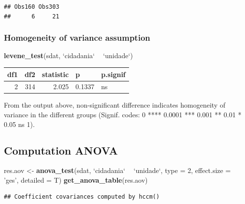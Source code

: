 \documentclass[]{article}
\newenvironment{Shaded}{\begin{snugshade}}{\end{snugshade}}
\newcommand{\DataTypeTok}[1]{\textcolor[rgb]{0.13,0.29,0.53}{#1}}
\newcommand{\DecValTok}[1]{\textcolor[rgb]{0.00,0.00,0.81}{#1}}
\newcommand{\KeywordTok}[1]{\textcolor[rgb]{0.13,0.29,0.53}{\textbf{#1}}}
\newcommand{\NormalTok}[1]{#1}
\newcommand{\OperatorTok}[1]{\textcolor[rgb]{0.81,0.36,0.00}{\textbf{#1}}}
\newcommand{\StringTok}[1]{\textcolor[rgb]{0.31,0.60,0.02}{#1}}
\begin{document}
\begin{verbatim}
## Obs160 Obs303 
##      6     21
\end{verbatim}

\hypertarget{homogeneity-of-variance-assumption}{%
\subsubsection{Homogeneity of variance
assumption}\label{homogeneity-of-variance-assumption}}

\begin{Shaded}
\begin{Highlighting}[]
\KeywordTok{levene_test}\NormalTok{(sdat, }\StringTok{`}\DataTypeTok{cidadania}\StringTok{`} \OperatorTok{~}\StringTok{ `}\DataTypeTok{unidade}\StringTok{`}\NormalTok{)}
\end{Highlighting}
\end{Shaded}

\begin{longtable}[]{@{}rrrll@{}}
\toprule
df1 & df2 & statistic & p & p.signif\tabularnewline
\midrule
\endhead
2 & 314 & 2.025 & 0.1337 & ns\tabularnewline
\bottomrule
\end{longtable}

From the output above, non-significant difference indicates homogeneity
of variance in the different groups (Signif. codes: 0 **** 0.0001 ***
0.001 ** 0.01 * 0.05 ns 1).

\hypertarget{computation-anova}{%
\subsection{Computation ANOVA}\label{computation-anova}}

\begin{Shaded}
\begin{Highlighting}[]
\NormalTok{res.aov <-}\StringTok{ }\KeywordTok{anova_test}\NormalTok{(sdat, }\StringTok{`}\DataTypeTok{cidadania}\StringTok{`} \OperatorTok{~}\StringTok{ `}\DataTypeTok{unidade}\StringTok{`}\NormalTok{, }\DataTypeTok{type =} \DecValTok{2}\NormalTok{, }\DataTypeTok{effect.size =} \StringTok{'ges'}\NormalTok{, }\DataTypeTok{detailed =}\NormalTok{ T)}
\KeywordTok{get_anova_table}\NormalTok{(res.aov)}
\end{Highlighting}
\end{Shaded}

\begin{verbatim}
## Coefficient covariances computed by hccm()
\end{verbatim}
\end{document}

